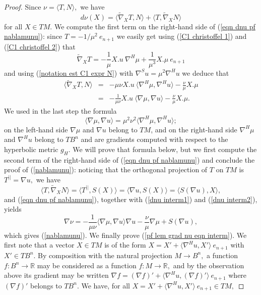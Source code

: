 \documentclass[10pt,a4paper]{amsart}
\newcommand{\R}{\mathbb{R}}
\begin{document}
\begin{proof}
Since $\nu=\langle T,N\rangle,$ we have
\begin{equation}\label{eqn dnu pf nablamunu}
d\nu(X)=\langle\widetilde{\nabla}_XT,N\rangle+\langle T,\widetilde{\nabla}_XN\rangle
\end{equation}
for all $X\in TM$. We compute the first term on the right-hand side of (\ref{eqn dnu pf nablamunu}): since $T=-1/\mu^2\ e_{n+1}$ we easily get using (\ref{C1 christoffel 1}) and (\ref{C1 christoffel 2}) that
$$\widetilde{\nabla}_XT=-\frac{1}{\mu}X.u\ \nabla^H\mu+\frac{1}{\mu^3}X.\mu\ e_{n+1}$$
and using (\ref{notation est C1 expr N}) with $\nabla^Su=\mu^2\nabla^Hu$ we deduce that
\begin{eqnarray}
\langle\widetilde{\nabla}_XT,N\rangle&=&-\mu\nu X.u\ \langle\nabla^H\mu,\nabla^H u\rangle-\frac{\nu}{\mu}X.\mu\nonumber\\
&=&-\frac{1}{\mu\nu} X.u\ \langle\nabla\mu,\nabla u\rangle-\frac{\nu}{\mu}X.\mu.\label{dnu interm1}
\end{eqnarray}
We used in the last step the formula
\begin{equation}\label{pf lem grad nu eqn interm} 
\langle\nabla\mu,\nabla u\rangle=\mu^2\nu^2\langle\nabla^H\mu,\nabla^H u\rangle;
\end{equation}
on the left-hand side $\nabla\mu$ and $\nabla u$ belong to $TM$, and on the right-hand side $\nabla^H\mu$ and $\nabla^H u$ belong to $TB^n$ and are gradients computed with respect to the hyperbolic metric $g_H.$ We will prove that formula below, but we first compute the second term of the right-hand side of (\ref{eqn dnu pf nablamunu}) and conclude the proof of (\ref{nablamunu}): noticing that the orthogonal projection of $T$ on $TM$ is $T^{||}=\nabla u,$ we have
\begin{equation}\label{dnu interm2}
\langle T,\widetilde{\nabla}_XN\rangle=\langle T^{||},S(X)\rangle=\langle\nabla u,S(X)\rangle=\langle S(\nabla u),X\rangle,
\end{equation}
and (\ref{eqn dnu pf nablamunu}), together with (\ref{dnu interm1}) and (\ref{dnu interm2}), yields
$$\nabla\nu=-\frac{1}{\mu\nu}\langle\nabla\mu,\nabla u\rangle\nabla u-\frac{\nu}{\mu}\nabla\mu+S(\nabla u),$$
which gives (\ref{nablamunu}). We finally prove (\ref{pf lem grad nu eqn interm}). We first note that a vector $X\in TM$ is of the form $X=X'+\langle\nabla^Hu,X'\rangle\ e_{n+1}$ with $X'\in TB^n$. By composition with the natural projection $M\rightarrow B^n,$ a function $f:B^n\rightarrow\R$ may be considered as a function $f:M\rightarrow\R,$ and by the observation above its gradient may be written $\nabla f=(\nabla f)'+\langle\nabla ^H u,(\nabla f)'\rangle\ e_{n+1}$ where $(\nabla f)'$ belongs to $TB^n.$ We have, for all $X=X'+\langle\nabla^Hu,X'\rangle\ e_{n+1}\in TM,$

\end{proof}
\end{document}
